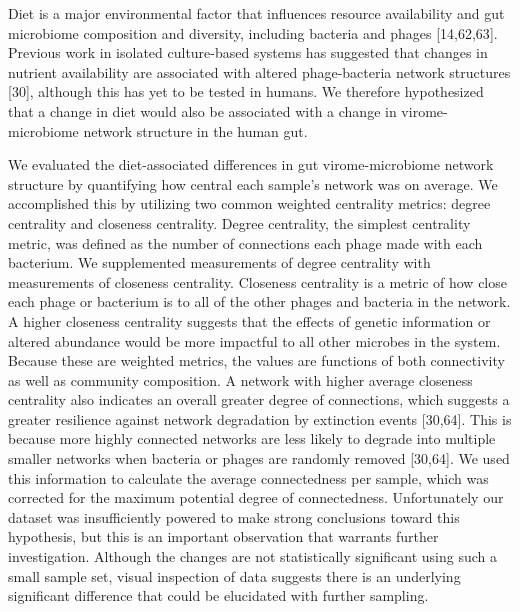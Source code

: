 \documentclass[12pt,]{article}
\begin{document}
Diet is a major environmental factor that influences resource
availability and gut microbiome composition and diversity, including
bacteria and phages {[}14,62,63{]}. Previous work in isolated
culture-based systems has suggested that changes in nutrient
availability are associated with altered phage-bacteria network
structures {[}30{]}, although this has yet to be tested in humans. We
therefore hypothesized that a change in diet would also be associated
with a change in virome-microbiome network structure in the human gut.

We evaluated the diet-associated differences in gut virome-microbiome
network structure by quantifying how central each sample's network was
on average. We accomplished this by utilizing two common weighted
centrality metrics: degree centrality and closeness centrality. Degree
centrality, the simplest centrality metric, was defined as the number of
connections each phage made with each bacterium. We supplemented
measurements of degree centrality with measurements of closeness
centrality. Closeness centrality is a metric of how close each phage or
bacterium is to all of the other phages and bacteria in the network. A
higher closeness centrality suggests that the effects of genetic
information or altered abundance would be more impactful to all other
microbes in the system. Because these are weighted metrics, the values
are functions of both connectivity as well as community composition. A
network with higher average closeness centrality also indicates an
overall greater degree of connections, which suggests a greater
resilience against network degradation by extinction events {[}30,64{]}.
This is because more highly connected networks are less likely to
degrade into multiple smaller networks when bacteria or phages are
randomly removed {[}30,64{]}. We used this information to calculate the
average connectedness per sample, which was corrected for the maximum
potential degree of connectedness. Unfortunately our dataset was
insufficiently powered to make strong conclusions toward this
hypothesis, but this is an important observation that warrants further
investigation. Although the changes are not statistically significant
using such a small sample set, visual inspection of data suggests there
is an underlying significant difference that could be elucidated with
further sampling.
\end{document}

